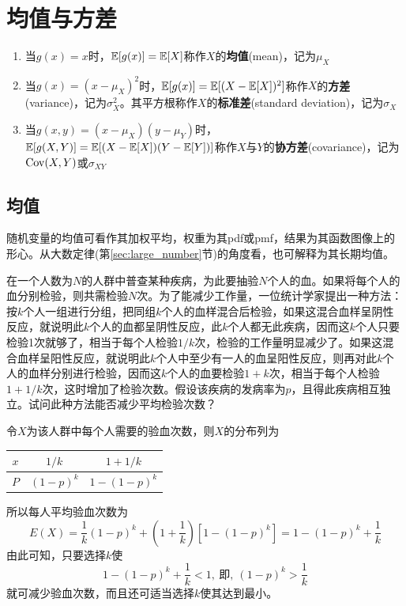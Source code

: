 \section{均值与方差}

\begin{definition}
    \begin{enumerate}
        \item 当$g(x)=x$时，$\mathbb{E}[g(x)]=\mathbb{E}[X]$称作$X$的\textbf{均值}(mean)，记为$\mu_X$
        \item 当$g(x)=(x-\mu_X)^{2}$时，$\mathbb{E}[g(x)]=\mathbb{E}[(X-\mathbb{E}[X])^{2}]$称作$X$的\textbf{方差}(variance)，记为$\sigma^2_X$。其平方根称作$X$的\textbf{标准差}(standard deviation)，记为$\sigma_X$
        \item 当$g(x,y)=(x-\mu_X)(y-\mu_Y)$时，$\mathbb{E}[g(X,Y)]=\mathbb{E}[(X-\mathbb{E}[X])(Y-\mathbb{E}[Y])]$称作$X$与$Y$的\textbf{协方差}(covariance)，记为$\operatorname{Cov}(X,Y)$或$\sigma_{XY}$
    \end{enumerate}
\end{definition}

\subsection{均值}

随机变量的均值可看作其加权平均，权重为其pdf或pmf，结果为其函数图像上的形心。从大数定律(第\ref{sec:large_number}节)的角度看，也可解释为其长期均值。

\begin{example}
    在一个人数为$N$的人群中普查某种疾病，为此要抽验$N$个人的血。如果将每个人的血分别检验，则共需检验$N$次。为了能减少工作量，一位统计学家提出一种方法：按$k$个人一组进行分组，把同组$k$个人的血样混合后检验，如果这混合血样呈阴性反应，就说明此$k$个人的血都呈阴性反应，此$k$个人都无此疾病，因而这$k$个人只要检验1次就够了，相当于每个人检验$1/k$次，检验的工作量明显减少了。如果这混合血样呈阳性反应，就说明此$k$个人中至少有一人的血呈阳性反应，则再对此$k$个人的血样分别进行检验，因而这$k$个人的血要检验$1+k$次，相当于每个人检验$1+1/k$次，这时增加了检验次数。假设该疾病的发病率为$p$，且得此疾病相互独立。试问此种方法能否减少平均检验次数？
\end{example}
\begin{solution}
    令$X$为该人群中每个人需要的验血次数，则$X$的分布列为
    \begin{table}[htbp]
        \centering
        \begin{tabular}{c|cc}
            $x$ & $1 / k$   & $1+1 / k$   \\\midrule
            $P$ & $(1-p)^k$ & $1-(1-p)^k$ \\
        \end{tabular}
    \end{table}
    所以每人平均验血次数为
    \[ E(X)=\frac1{k}(1-p)^k+(1+\frac1{k})[1-(1-p)^k]=1-(1-p)^k+\frac1{k} \]
    由此可知，只要选择$k$使
    \[ 1-(1-p)^k+\frac1{k}<1,\ \text{即},\ (1-p)^k>\frac1{k} \]
    就可减少验血次数，而且还可适当选择$k$使其达到最小。
\end{solution}

